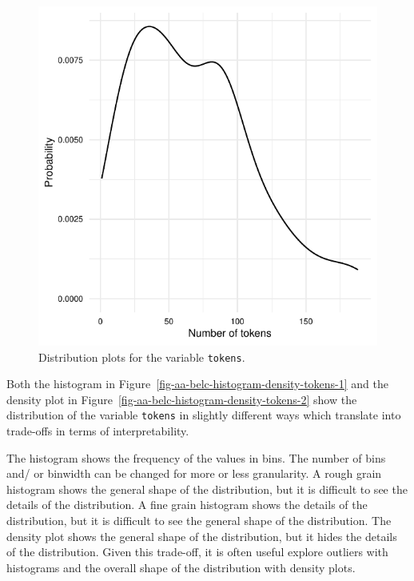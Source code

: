 \documentclass[
  letterpaper,
]{latex/krantz}
\theoremstyle{definition}
\theoremstyle{remark}
\begin{document}
\begin{figure}[H]
\begin{minipage}{0.50\linewidth}
{\includegraphics{part_2/3_analysis_files/figure-pdf/fig-aa-belc-histogram-density-tokens-2.pdf}

}


\end{minipage}%

\caption{\label{fig-aa-belc-histogram-density-tokens}Distribution plots
for the variable \texttt{tokens}.}

\end{figure}%

Both the histogram in
Figure~\ref{fig-aa-belc-histogram-density-tokens-1} and the density plot
in Figure~\ref{fig-aa-belc-histogram-density-tokens-2} show the
distribution of the variable \texttt{tokens} in slightly different ways
which translate into trade-offs in terms of interpretability.

The histogram shows the frequency of the values in bins. The number of
bins and/ or binwidth can be changed for more or less granularity. A
rough grain histogram shows the general shape of the distribution, but
it is difficult to see the details of the distribution. A fine grain
histogram shows the details of the distribution, but it is difficult to
see the general shape of the distribution. The density plot shows the
general shape of the distribution, but it hides the details of the
distribution. Given this trade-off, it is often useful explore outliers
with histograms and the overall shape of the distribution with density
plots.
\end{document}
